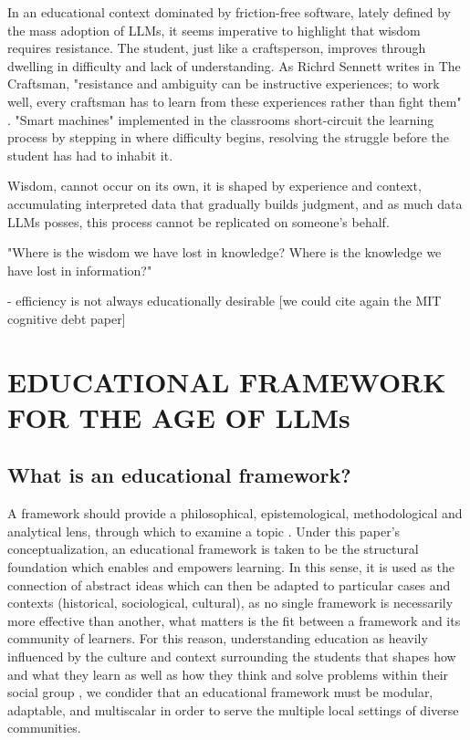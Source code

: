 \documentclass{article}
\begin{document}
In an educational context dominated by friction-free software, lately defined by the mass adoption of LLMs, it seems imperative to highlight that wisdom requires resistance. The student, just like a craftsperson, improves through dwelling in difficulty and lack of understanding. As Richrd Sennett writes in The Craftsman, "resistance and ambiguity can be instructive experiences; to work well, every craftsman has to learn from these experiences rather than fight them" \cite{sennett2008craftsman}. "Smart machines" implemented in the classrooms short-circuit the learning process by stepping in where difficulty begins, resolving the struggle before the student has had to inhabit it.


Wisdom, cannot occur on its own, it is shaped by experience and context, accumulating interpreted data that gradually builds judgment, and as much data LLMs posses, this process cannot be replicated on someone's behalf.

"Where is the wisdom we have lost in knowledge? 
Where is the knowledge we have lost in information?" \cite{eliot1934rock}


- efficiency is not always educationally desirable [we could cite again the MIT cognitive debt paper]


\section{EDUCATIONAL FRAMEWORK FOR THE AGE OF LLMs}

\subsection{What is an educational framework?}
A framework should provide a philosophical, epistemological, methodological and analytical lens, through which to examine a topic \cite{grant2014understanding}. Under this paper's conceptualization, an educational framework is taken to be the structural foundation which enables and empowers learning. In this sense, it is used as the connection of abstract ideas which can then be adapted to particular cases and contexts (historical, sociological, cultural), as no single framework is necessarily more effective than another, what matters is the fit between a framework and its community of learners. 
For this reason, understanding education as heavily influenced by the culture and context surrounding the students that shapes how and what they learn as well as how they think and solve problems within their social group \cite{vygotsky1978mind}, we condider that an educational framework must be modular, adaptable, and multiscalar in order to serve the multiple local settings of diverse communities.
\end{document}
